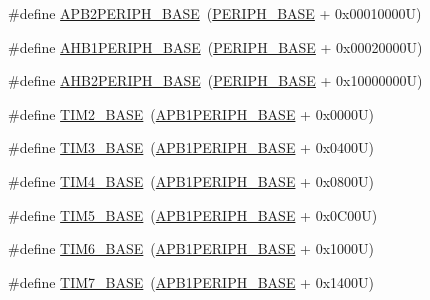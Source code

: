\begin{DoxyCompactItemize}
\item 
\#define \hyperlink{group___peripheral__memory__map_ga25b99d6065f1c8f751e78f43ade652cb}{A\+P\+B2\+P\+E\+R\+I\+P\+H\+\_\+\+B\+A\+SE}~(\hyperlink{group___peripheral__memory__map_ga9171f49478fa86d932f89e78e73b88b0}{P\+E\+R\+I\+P\+H\+\_\+\+B\+A\+SE} + 0x00010000\+U)
\item 
\#define \hyperlink{group___peripheral__memory__map_ga811a9a4ca17f0a50354a9169541d56c4}{A\+H\+B1\+P\+E\+R\+I\+P\+H\+\_\+\+B\+A\+SE}~(\hyperlink{group___peripheral__memory__map_ga9171f49478fa86d932f89e78e73b88b0}{P\+E\+R\+I\+P\+H\+\_\+\+B\+A\+SE} + 0x00020000\+U)
\item 
\#define \hyperlink{group___peripheral__memory__map_gaeedaa71d22a1948492365e2cd26cfd46}{A\+H\+B2\+P\+E\+R\+I\+P\+H\+\_\+\+B\+A\+SE}~(\hyperlink{group___peripheral__memory__map_ga9171f49478fa86d932f89e78e73b88b0}{P\+E\+R\+I\+P\+H\+\_\+\+B\+A\+SE} + 0x10000000\+U)
\item 
\#define \hyperlink{group___peripheral__memory__map_ga00d0fe6ad532ab32f0f81cafca8d3aa5}{T\+I\+M2\+\_\+\+B\+A\+SE}~(\hyperlink{group___peripheral__memory__map_ga45666d911f39addd4c8c0a0ac3388cfb}{A\+P\+B1\+P\+E\+R\+I\+P\+H\+\_\+\+B\+A\+SE} + 0x0000\+U)
\item 
\#define \hyperlink{group___peripheral__memory__map_gaf0c34a518f87e1e505cd2332e989564a}{T\+I\+M3\+\_\+\+B\+A\+SE}~(\hyperlink{group___peripheral__memory__map_ga45666d911f39addd4c8c0a0ac3388cfb}{A\+P\+B1\+P\+E\+R\+I\+P\+H\+\_\+\+B\+A\+SE} + 0x0400\+U)
\item 
\#define \hyperlink{group___peripheral__memory__map_ga56e2d44b0002f316527b8913866a370d}{T\+I\+M4\+\_\+\+B\+A\+SE}~(\hyperlink{group___peripheral__memory__map_ga45666d911f39addd4c8c0a0ac3388cfb}{A\+P\+B1\+P\+E\+R\+I\+P\+H\+\_\+\+B\+A\+SE} + 0x0800\+U)
\item 
\#define \hyperlink{group___peripheral__memory__map_ga3e1671477190d065ba7c944558336d7e}{T\+I\+M5\+\_\+\+B\+A\+SE}~(\hyperlink{group___peripheral__memory__map_ga45666d911f39addd4c8c0a0ac3388cfb}{A\+P\+B1\+P\+E\+R\+I\+P\+H\+\_\+\+B\+A\+SE} + 0x0\+C00\+U)
\item 
\#define \hyperlink{group___peripheral__memory__map_ga8268ec947929f192559f28c6bf7d1eac}{T\+I\+M6\+\_\+\+B\+A\+SE}~(\hyperlink{group___peripheral__memory__map_ga45666d911f39addd4c8c0a0ac3388cfb}{A\+P\+B1\+P\+E\+R\+I\+P\+H\+\_\+\+B\+A\+SE} + 0x1000\+U)
\item 
\#define \hyperlink{group___peripheral__memory__map_ga0ebf54364c6a2be6eb19ded6b18b6387}{T\+I\+M7\+\_\+\+B\+A\+SE}~(\hyperlink{group___peripheral__memory__map_ga45666d911f39addd4c8c0a0ac3388cfb}{A\+P\+B1\+P\+E\+R\+I\+P\+H\+\_\+\+B\+A\+SE} + 0x1400\+U)

\end{DoxyCompactItemize}
